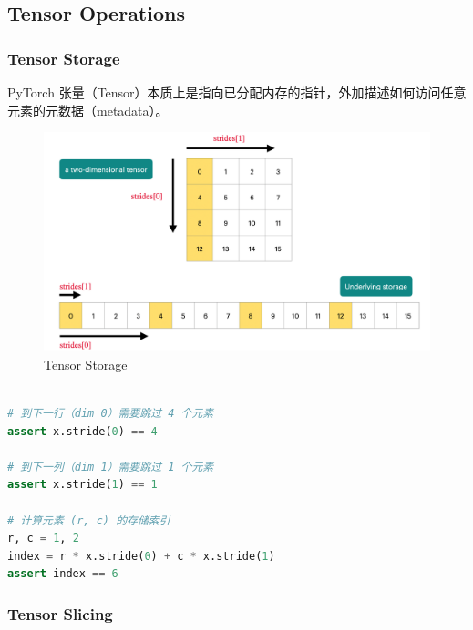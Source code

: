 \clearpage
\subsection{Tensor Operations}

\subsubsection{Tensor Storage}

PyTorch 张量（Tensor）本质上是指向已分配内存的指针，外加描述如何访问任意元素的元数据（metadata）。

\begin{figure}[htbp]
  \centering
  \includegraphics[width=0.9\linewidth]{figs/lec2/lec2.41.png}
  \caption{Tensor Storage}
  \label{fig:Tensor Storage}
\end{figure}  

\begin{lstlisting}[language=Python]

# 到下一行（dim 0）需要跳过 4 个元素
assert x.stride(0) == 4

# 到下一列（dim 1）需要跳过 1 个元素
assert x.stride(1) == 1

# 计算元素 (r, c) 的存储索引
r, c = 1, 2
index = r * x.stride(0) + c * x.stride(1)
assert index == 6
\end{lstlisting}

\subsubsection{Tensor Slicing}

